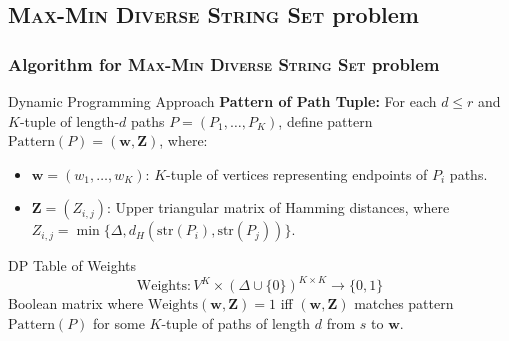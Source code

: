 \documentclass{beamer}
\begin{document}
\subsection{\textsc{Max-Min Diverse String Set} problem}
\begin{frame}
    \frametitle{Algorithm for \textsc{Max-Min Diverse String Set} problem}
    \begin{block}{Dynamic Programming Approach}
        \textbf{Pattern of Path Tuple:} For each \( d \leq r \) and \( K \)-tuple of length-\( d \) paths \( P = (P_1, \dots, P_K) \),
        define pattern \( \text{Pattern}(P) = (\mathbf{w}, \mathbf{Z}) \), where:
        \begin{itemize}
            \item \( \mathbf{w} = (w_1, \ldots, w_K) \): \( K \)-tuple of vertices representing endpoints of \( P_i \) paths.
            \item \( \mathbf{Z} = (Z_{i,j}) \): Upper triangular matrix of Hamming distances, where \( Z_{i,j} = \min \{\Delta, d_H(\text{str}(P_i), \text{str}(P_j))\} \).
        \end{itemize}
    \end{block}
    \begin{block}{DP Table of Weights}
        \begin{equation}
            \text{Weights}: V^K \times (\Delta \cup \{0\})^{K \times K} \to \{0, 1\}
        \end{equation}
        Boolean matrix where \( \text{Weights}(\mathbf{w}, \mathbf{Z}) = 1 \) iff \( (\mathbf{w}, \mathbf{Z}) \) matches pattern \( \text{Pattern}(P) \) for some \( K \)-tuple of paths of length \( d \) from $s$ to $\mathbf{w}$.
    \end{block}
\end{frame}
\end{document}
